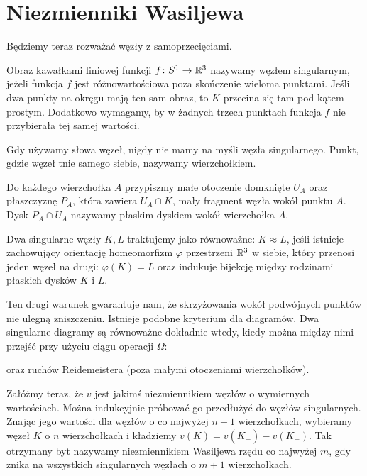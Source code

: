 \section{Niezmienniki Wasiljewa} %
\label{sec:vassiliev}
Będziemy teraz rozważać węzły z samoprzecięciami.

\begin{definition}
	Obraz kawałkami liniowej funkcji $f \colon S^1 \to \mathbb R^3$ nazywamy węzłem singularnym, jeżeli funkcja $f$ jest różnowartościowa poza skończenie wieloma punktami.
	Jeśli dwa punkty na okręgu mają ten sam obraz, to $K$ przecina się tam pod kątem prostym.
	Dodatkowo wymagamy, by w żadnych trzech punktach funkcja $f$ nie przybierała tej samej wartości.
\end{definition}

Gdy używamy słowa węzeł, nigdy nie mamy na myśli węzła singularnego.
Punkt, gdzie węzeł tnie samego siebie, nazywamy wierzchołkiem.

Do każdego wierzchołka $A$ przypiszmy małe otoczenie domknięte $U_A$ oraz płaszczyznę $P_A$, która zawiera $U_A \cap K$, mały fragment węzła wokół punktu $A$. Dysk $P_A \cap U_A$ nazywamy płaskim dyskiem wokół wierzchołka $A$.

\begin{definition}
	Dwa singularne węzły $K, L$ traktujemy jako równoważne: $K \approx L$, jeśli istnieje zachowujący orientację homeomorfizm $\varphi$ przestrzeni $\mathbb R^3$ w siebie, który przenosi jeden węzeł na drugi: $\varphi(K) = L$ oraz indukuje bijekcję między rodzinami płaskich dysków $K$ i $L$.
\end{definition}

Ten drugi warunek gwarantuje nam, że skrzyżowania wokół podwójnych punktów nie ulegną zniszczeniu.
Istnieje podobne kryterium dla diagramów.
Dwa singularne diagramy są równoważne dokładnie wtedy, kiedy można między nimi przejść przy użyciu ciągu operacji $\Omega$:


oraz ruchów Reidemeistera (poza małymi otoczeniami wierzchołków).

Załóżmy teraz, że $v$ jest jakimś niezmiennikiem węzłów o wymiernych wartościach.
Można indukcyjnie próbować go przedłużyć do węzłów singularnych.
Znając jego wartości dla węzłów o co najwyżej $n - 1$ wierzchołkach,  wybieramy węzeł $K$ o $n$ wierzchołkach i kładziemy $v(K) = v(K_+) - v(K_-)$.
Tak otrzymany byt nazywamy niezmiennikiem Wasiljewa rzędu co najwyżej $m$, gdy znika na wszystkich singularnych węzłach o $m + 1$ wierzchołkach.

